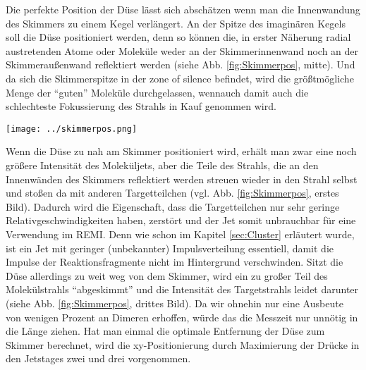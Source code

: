 Die perfekte Position der Düse lässt sich abschätzen wenn man die Innenwandung des Skimmers zu einem Kegel verlängert. An der Spitze des imaginären Kegels soll die Düse positioniert werden, denn so können die, in erster Näherung radial austretenden Atome oder Moleküle weder an der Skimmerinnenwand noch an der Skimmeraußenwand reflektiert werden (siehe Abb. \ref{fig:Skimmerpos}, mitte). Und da sich die Skimmerspitze in der zone of silence befindet, wird die größtmögliche Menge der \enquote{guten} Moleküle durchgelassen, wennauch damit auch die schlechteste Fokussierung des Strahls in Kauf genommen wird.
%
\begin{center}
\begin{minipage}{\linewidth}
\centering
\texttt{[image: ../skimmerpos.png]}%
 \label{fig:Skimmerpos}
\end{minipage} 
\end{center} 

Wenn die Düse zu nah am Skimmer positioniert wird, erhält man zwar eine noch größere Intensität des Moleküljets, aber die Teile des Strahls, die an den Innenwänden des Skimmers reflektiert werden streuen wieder in den Strahl selbst und stoßen da mit anderen Targetteilchen (vgl. Abb. \ref{fig:Skimmerpos}, erstes Bild). Dadurch wird die Eigenschaft, dass die Targetteilchen nur sehr geringe Relativgeschwindigkeiten haben, zerstört und der Jet somit unbrauchbar für eine Verwendung im REMI. Denn wie schon im Kapitel \ref{sec:Cluster} erläutert wurde, ist ein Jet mit geringer (unbekannter) Impulsverteilung essentiell, damit die Impulse der Reaktionsfragmente nicht im Hintergrund verschwinden. 
Sitzt die Düse allerdings zu weit weg von dem Skimmer, wird ein zu großer Teil des Molekülstrahls \enquote{abgeskimmt} und die Intensität des Targetstrahls leidet darunter (siehe Abb. \ref{fig:Skimmerpos}, drittes Bild). Da wir ohnehin nur eine Ausbeute von wenigen Prozent an Dimeren erhoffen, würde das die Messzeit nur unnötig in die Länge ziehen.
Hat man einmal die optimale Entfernung der Düse zum Skimmer berechnet, wird die xy-Positionierung durch Maximierung der Drücke in den Jetstages zwei und drei vorgenommen.



